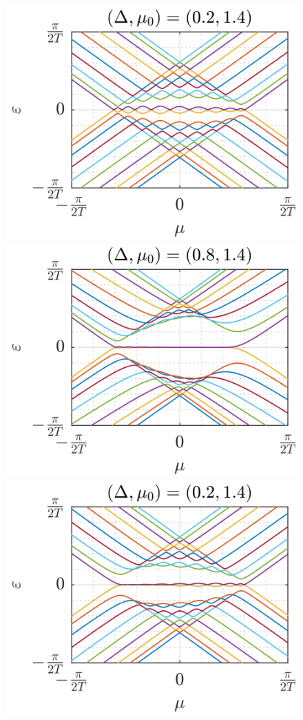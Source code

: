 \documentclass[11pt]{report}
\begin{document}
\begin{figure}
\centering
\includegraphics[scale=1]{Figures/New/Quasienergies_Exact3.png}%
\includegraphics[scale=1]{Figures/New/Quasienergies_Exact4.png}\\
\includegraphics[scale=1]{Figures/New/Quasienergies_Expansion3.png}%

\end{figure}
\end{document}
